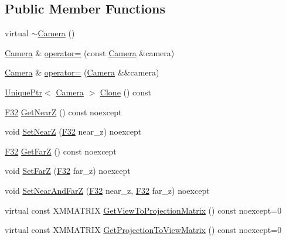 \subsection*{Public Member Functions}
\begin{DoxyCompactItemize}
\item 
virtual \hyperlink{classmage_1_1_camera_aa4718c93578d160299bdc24039cc256f}{$\sim$\+Camera} ()
\item 
\hyperlink{classmage_1_1_camera}{Camera} \& \hyperlink{classmage_1_1_camera_a9ae561f9cc0ed0dd855ee1d824dad090}{operator=} (const \hyperlink{classmage_1_1_camera}{Camera} \&camera)
\item 
\hyperlink{classmage_1_1_camera}{Camera} \& \hyperlink{classmage_1_1_camera_a83e33f57394e85eee58745eb8e05b282}{operator=} (\hyperlink{classmage_1_1_camera}{Camera} \&\&camera)
\item 
\hyperlink{namespacemage_a3316d7143a973e37adf1110f2e80ca31}{Unique\+Ptr}$<$ \hyperlink{classmage_1_1_camera}{Camera} $>$ \hyperlink{classmage_1_1_camera_a830e9a071449f1026fd43fcd19577e6c}{Clone} () const
\item 
\hyperlink{namespacemage_aa97e833b45f06d60a0a9c4fc22ae02c0}{F32} \hyperlink{classmage_1_1_camera_add4054d66911dd183cdec85eda77b4a1}{Get\+NearZ} () const noexcept
\item 
void \hyperlink{classmage_1_1_camera_a404c336596263f7b55f4ff2e5097f8e9}{Set\+NearZ} (\hyperlink{namespacemage_aa97e833b45f06d60a0a9c4fc22ae02c0}{F32} near\+\_\+z) noexcept
\item 
\hyperlink{namespacemage_aa97e833b45f06d60a0a9c4fc22ae02c0}{F32} \hyperlink{classmage_1_1_camera_a47e6801d228891453540b0c1e787724a}{Get\+FarZ} () const noexcept
\item 
void \hyperlink{classmage_1_1_camera_aa49995ef824eeb807656921406d248a5}{Set\+FarZ} (\hyperlink{namespacemage_aa97e833b45f06d60a0a9c4fc22ae02c0}{F32} far\+\_\+z) noexcept
\item 
void \hyperlink{classmage_1_1_camera_aa075b0f6f30376217c0058a70df9d845}{Set\+Near\+And\+FarZ} (\hyperlink{namespacemage_aa97e833b45f06d60a0a9c4fc22ae02c0}{F32} near\+\_\+z, \hyperlink{namespacemage_aa97e833b45f06d60a0a9c4fc22ae02c0}{F32} far\+\_\+z) noexcept
\item 
virtual const X\+M\+M\+A\+T\+R\+IX \hyperlink{classmage_1_1_camera_ad3e8380ba9718a983f72d753d08f556e}{Get\+View\+To\+Projection\+Matrix} () const noexcept=0
\item 
virtual const X\+M\+M\+A\+T\+R\+IX \hyperlink{classmage_1_1_camera_a7a919b85084c79786a65c6df8872f6f1}{Get\+Projection\+To\+View\+Matrix} () const noexcept=0
\end{DoxyCompactItemize}
